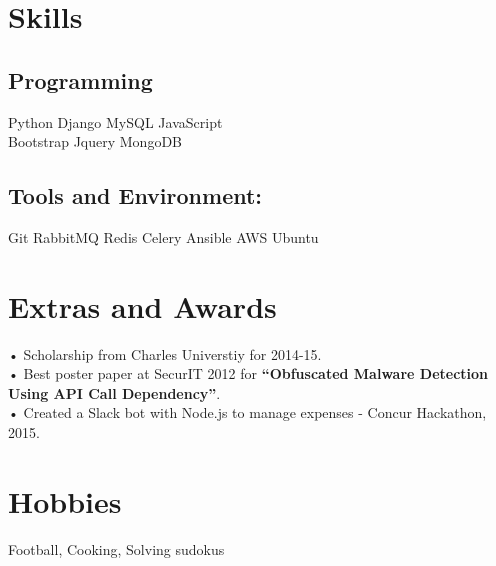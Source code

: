 \documentclass[]{deedy-resume-openfont}
\begin{document}
\begin{minipage}[t]{0.33\textwidth}
\section{Skills}
\subsection{Programming}
Python \textbullet{} Django \textbullet{} MySQL \textbullet{} JavaScript \\
Bootstrap \textbullet{} Jquery \textbullet{} MongoDB  \\
\subsection{Tools and Environment:}
Git \textbullet{} RabbitMQ \textbullet{} Redis \textbullet{} Celery \textbullet{}  Ansible \textbullet{} AWS \textbullet{} Ubuntu\\
\sectionsep


\section{Extras and Awards}
• Scholarship from Charles Universtiy for 2014-15. \\
• Best poster paper at SecurIT 2012 for \textbf{“Obfuscated Malware Detection Using API Call Dependency”}.\\
• Created a Slack bot with Node.js to manage expenses - Concur Hackathon, 2015.\\
\sectionsep


\section{Hobbies}
Football, Cooking, Solving sudokus
\sectionsep

%
%

\end{minipage}
\hfill
\end{document}
